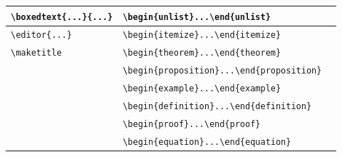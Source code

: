 \documentclass{article}
\begin{document}
\begin{center}
\begin{tabular}{|l|l|l|}
\verb+\boxedtext{...}{...}+&  \verb+\begin{unlist}...\end{unlist}+&    \\\hline
\verb+\editor{...}+&   \verb+\begin{itemize}...\end{itemize}+&  \\\hline
\verb+\maketitle+&      \verb+\begin{theorem}...\end{theorem}+&  \\\hline
&     \verb+\begin{proposition}...\end{proposition}+&    \\\hline
 &      \verb+\begin{example}...\end{example}+&    \\\hline
 &      \verb+\begin{definition}...\end{definition}+&    \\\hline
 &      \verb+\begin{proof}...\end{proof}+&      \\\hline
&       \verb+\begin{equation}...\end{equation}+&        \\
\hline
\end{tabular}\end{center}
\end{document}
